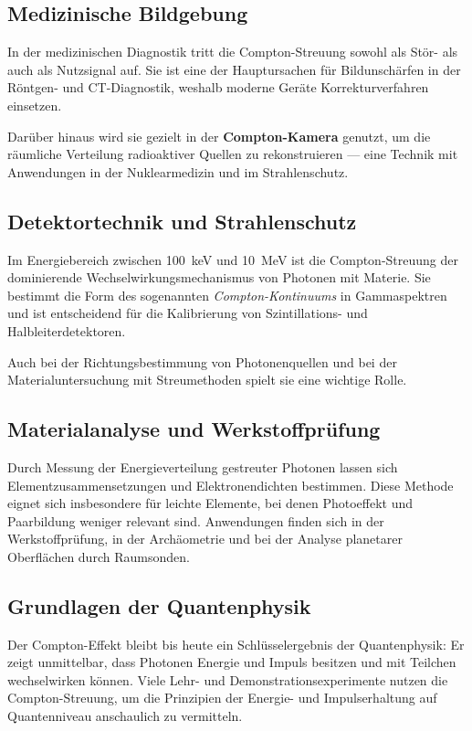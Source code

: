 \subsection{Medizinische Bildgebung}
In der medizinischen Diagnostik tritt die Compton-Streuung sowohl als
Stör- als auch als Nutzsignal auf. 
Sie ist eine der Hauptursachen für Bildunschärfen in der Röntgen- und CT-Diagnostik,
weshalb moderne Geräte Korrekturverfahren einsetzen. 

Darüber hinaus wird sie gezielt in der \textbf{Compton-Kamera} genutzt,
um die räumliche Verteilung radioaktiver Quellen zu rekonstruieren —
eine Technik mit Anwendungen in der Nuklearmedizin und im Strahlenschutz.

\subsection{Detektortechnik und Strahlenschutz}
Im Energiebereich zwischen \SI{100}{\kilo\electronvolt} und \SI{10}{\mega\electronvolt}
ist die Compton-Streuung der dominierende Wechselwirkungsmechanismus von Photonen
mit Materie. Sie bestimmt die Form des sogenannten \emph{Compton-Kontinuums}
in Gammaspektren und ist entscheidend für die Kalibrierung von Szintillations-
und Halbleiterdetektoren. 

Auch bei der Richtungsbestimmung von Photonenquellen und bei der
Materialuntersuchung mit Streumethoden spielt sie eine wichtige Rolle.

\subsection{Materialanalyse und Werkstoffprüfung}
Durch Messung der Energieverteilung gestreuter Photonen lassen sich
Elementzusammensetzungen und Elektronendichten bestimmen. 
Diese Methode eignet sich insbesondere für leichte Elemente,
bei denen Photoeffekt und Paarbildung weniger relevant sind.
Anwendungen finden sich in der Werkstoffprüfung, in der Archäometrie
und bei der Analyse planetarer Oberflächen durch Raumsonden.

\subsection{Grundlagen der Quantenphysik}
Der Compton-Effekt bleibt bis heute ein Schlüsselergebnis der Quantenphysik:
Er zeigt unmittelbar, dass Photonen Energie und Impuls besitzen und mit
Teilchen wechselwirken können. 
Viele Lehr- und Demonstrationsexperimente nutzen die Compton-Streuung, 
um die Prinzipien der Energie- und Impulserhaltung auf Quantenniveau
anschaulich zu vermitteln.

